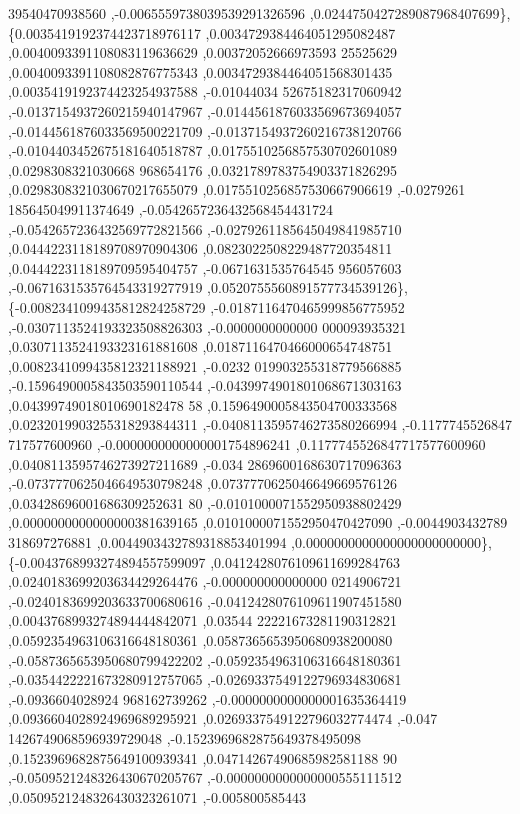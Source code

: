 \begin{DoxyCode}
      39540470938560 ,-0.0065559738039539291326596 ,0.0244750427289087968407699\},
\{0.0035419192374423718976117 ,0.0034729384464051295082487 ,0.0040093391108083119636629 ,0.00372052666973593
      25525629 ,0.0040093391108082876775343 ,0.0034729384464051568301435 ,0.0035419192374423254937588 ,-0.01044034
      52675182317060942 ,-0.0137154937260215940147967 ,-0.0144561876033569673694057 ,-0.0144561876033569500221709 
      ,-0.0137154937260216738120766 ,-0.0104403452675181640518787 ,0.0175510256857530702601089 ,0.0298308321030668
      968654176 ,0.0321789783754903371826295 ,0.0298308321030670217655079 ,0.0175510256857530667906619 ,-0.0279261
      185645049911374649 ,-0.0542657236432568454431724 ,-0.0542657236432569772821566 ,-0.0279261185645049841985710
       ,0.0444223118189708970904306 ,0.0823022508229487720354811 ,0.0444223118189709595404757 ,-0.0671631535764545
      956057603 ,-0.0671631535764543319277919 ,0.0520755560891577734539126\},
\{-0.0082341099435812824258729 ,-0.0187116470465999856775952 ,-0.0307113524193323508826303 ,-0.0000000000000
      000093935321 ,0.0307113524193323161881608 ,0.0187116470466000654748751 ,0.0082341099435812321188921 ,-0.0232
      019903255318779566885 ,-0.1596490005843503590110544 ,-0.0439974901801068671303163 ,0.04399749018010690182478
      58 ,0.1596490005843504700333568 ,0.0232019903255318293844311 ,-0.0408113595746273580266994 ,-0.1177745526847
      717577600960 ,-0.0000000000000001754896241 ,0.1177745526847717577600960 ,0.0408113595746273927211689 ,-0.034
      2869600168630717096363 ,-0.0737770625046649530798248 ,0.0737770625046649669576126 ,0.03428696001686309252631
      80 ,-0.0101000071552950938802429 ,0.0000000000000000381639165 ,0.0101000071552950470427090 ,-0.0044903432789
      318697276881 ,0.0044903432789318853401994 ,0.0000000000000000000000000\},
\{-0.0043768993274894557599097 ,0.0412428076109611699284763 ,0.0240183699203634429264476 ,-0.000000000000000
      0214906721 ,-0.0240183699203633700680616 ,-0.0412428076109611907451580 ,0.0043768993274894444842071 ,0.03544
      22221673281190312821 ,0.0592354963106316648180361 ,0.0587365653950680938200080 ,-0.0587365653950680799422202
       ,-0.0592354963106316648180361 ,-0.0354422221673280912757065 ,-0.0269337549122796934830681 ,-0.0936604028924
      968162739262 ,-0.0000000000000001635364419 ,0.0936604028924969689295921 ,0.0269337549122796032774474 ,-0.047
      1426749068596939729048 ,-0.1523969682875649378495098 ,0.1523969682875649100939341 ,0.04714267490685982581188
      90 ,-0.0509521248326430670205767 ,-0.0000000000000000555111512 ,0.0509521248326430323261071 ,-0.005800585443

\end{DoxyCode}
